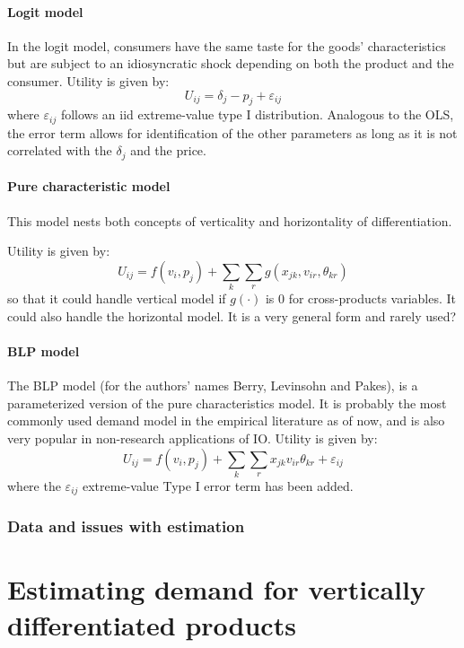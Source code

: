 \documentclass[12pt]{report}
\begin{document}
\subsubsection{Logit model}

In the logit model, consumers have the same taste for the goods' characteristics but are subject to an idiosyncratic shock depending on both the product and the consumer. Utility is given by: $$U_{ij} = \delta_j - p_j + \varepsilon_{ij} $$ where $\varepsilon_{ij}$ follows an iid extreme-value type I distribution. Analogous to the OLS, the error term allows for identification of the other parameters as long as it is not correlated with the $\delta_j$ and the price.

\subsubsection{Pure characteristic model}

This model nests both concepts of verticality and horizontality of differentiation.

Utility is given by: $$ U_{ij} = f(v_i, p_j) + \sum_{k}\sum_{r} g(x_{jk}, v_{ir}, \theta_{kr}) $$ so that it could handle vertical model if $g(\cdot)$ is 0 for cross-products variables. It could also handle the horizontal model. It is a very general form and rarely used?

\subsubsection{BLP model}

The BLP model (for the authors' names Berry, Levinsohn and Pakes), is a parameterized version of the pure characteristics model. It is probably the most commonly used demand model in the empirical literature as of now, and is also very popular in non-research applications of IO. Utility is given by: $$ U_{ij} = f(v_i, p_j) + \sum_{k}\sum_{r} x_{jk}v_{ir}\theta_{kr} + \varepsilon_{ij} $$ where the $\varepsilon_{ij}$ extreme-value Type I error term has been added.

\subsection{Data and issues with estimation}



\chapter{Estimating demand for vertically differentiated products}
\end{document}
